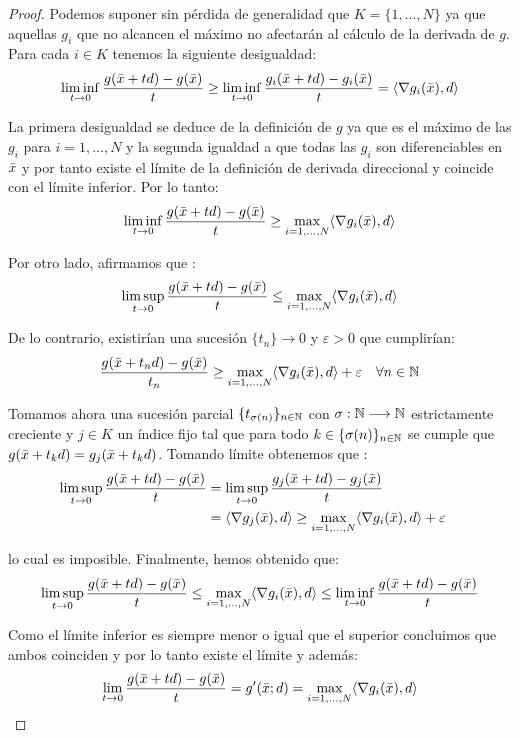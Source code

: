 	\begin{proof}
		Podemos suponer sin pérdida de generalidad que $ K = \{1, ..., N \} $ ya que aquellas $ g_i $ que no alcancen el máximo no afectarán al cálculo de la derivada de $ g $. Para cada $ i \in K $ tenemos la siguiente desigualdad:
		\begin{equation*}
			\liminf_{t\rightarrow0}\frac{g(\bar{x}+td) - g(\bar{x})}{t} \geq \liminf_{t\rightarrow0}\frac{g_i(\bar{x}+td) - g_i(\bar{x})}{t} = \langle \nabla g_i(\bar{x}), d \rangle
		\end{equation*}
		
		La primera desigualdad se deduce de la definición de $ g $ ya que es el máximo de las $ g_i $ para $ i=1,...,N$ y la segunda igualdad a que todas las $ g_i $ son diferenciables en $ \bar{x} $ y por tanto existe el límite de la definición de derivada direccional y coincide con el límite inferior. Por lo tanto:
		\[
		\liminf_{t\rightarrow0}\frac{g(\bar{x}+td) - g(\bar{x})}{t} \geq \max_{i=1,...,N}\langle \nabla g_i(\bar{x}), d \rangle
		\]
		
		Por otro lado, afirmamos que :
		\begin{equation*}
			\limsup_{t\rightarrow0}\frac{g(\bar{x}+td) - g(\bar{x})}{t} \leq \max_{i=1,...,N}\langle \nabla g_i(\bar{x}), d \rangle
		\end{equation*}
		
		De lo contrario, existirían una sucesión $ \{t_n\}\rightarrow 0 $ y $ \varepsilon > 0 $ que cumplirían:
		\[
		\frac{g(\bar{x}+t_n d) - g(\bar{x})}{t_n} \geq \max_{i=1,...,N}\langle \nabla g_i(\bar{x}), d \rangle + \varepsilon \quad \forall n \in \mathbb{N}
		\]
		
		Tomamos ahora una sucesión parcial $ \{t_{\sigma(n)}\}_{n \in \mathbb{N}} $ con $ \sigma:\mathbb{N} \longrightarrow \mathbb{N} $ estrictamente creciente y $ j \in K $ un índice fijo tal que para todo $ k \in \{\sigma(n)\}_{n \in \mathbb{N}} $ se cumple que $ g(\bar{x} + t_k d) = g_j (\bar{x} + t_k d)$. Tomando límite obtenemos que :
		\begin{equation*}
		\begin{split}
		\limsup_{t\rightarrow0}\frac{g(\bar{x}+td) - g(\bar{x})}{t} &= 	\limsup_{t\rightarrow0}\frac{g_j(\bar{x}+td) - g_j(\bar{x})}{t} \\
		&= \langle \nabla g_j(\bar{x}), d \rangle \geq \max_{i=1,...,N}\langle \nabla g_i(\bar{x}), d \rangle + \varepsilon \quad
		\end{split}
		\end{equation*}

		lo cual es imposible. Finalmente, hemos obtenido que:
		\[
		\limsup_{t\rightarrow0}\frac{g(\bar{x}+td) - g(\bar{x})}{t} \leq \max_{i=1,...,N}\langle \nabla g_i(\bar{x}), d \rangle \leq 	\liminf_{t\rightarrow0}\frac{g(\bar{x}+td) - g(\bar{x})}{t}
		\]
		
		Como el límite inferior es siempre menor o igual que el superior concluimos que ambos coinciden y por lo tanto existe el límite y además:
		\[
		\lim_{t\rightarrow0}\frac{g(\bar{x}+td) - g(\bar{x})}{t} = g'(\bar{x};d) = \max_{i=1,...,N}\langle \nabla g_i(\bar{x}), d \rangle
		\]
	\end{proof}

